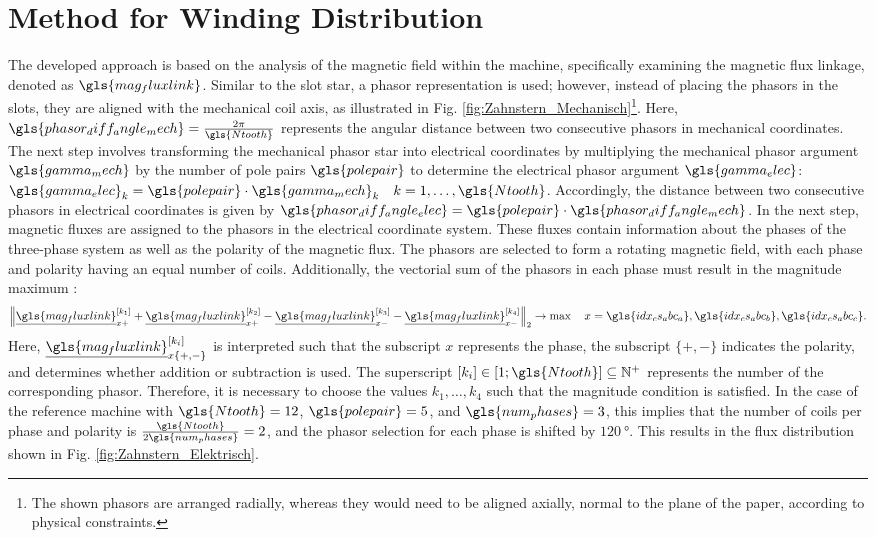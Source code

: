 \section{Method for Winding Distribution} \label{sec:WindingDist}
The developed approach is based on the analysis of the magnetic field within the machine, specifically examining the magnetic flux linkage, denoted as \(\gls{mag_fluxlink}\). Similar to the slot star, a phasor representation is used; however, instead of placing the phasors in the slots, they are aligned with the mechanical coil axis, as illustrated in Fig. \ref{fig:Zahnstern_Mechanisch}\footnote{The shown phasors are arranged radially, whereas they would need to be aligned axially, normal to the plane of the paper, according to physical constraints.}. Here, \(\gls{phasor_diff_angle_mech} = \frac{2\pi}{\gls{Ntooth}}\) represents the angular distance between two consecutive phasors in mechanical coordinates. The next step involves transforming the mechanical phasor star into electrical coordinates by multiplying the mechanical phasor argument \(\gls{gamma_mech}\) by the number of pole pairs \(\gls{polepair}\) to determine the electrical phasor argument \(\gls{gamma_elec}\): \(\gls{gamma_elec}_{k} = \gls{polepair} \cdot \gls{gamma_mech}_{k} \quad k = 1, \dots, \gls{Ntooth}\). Accordingly, the distance between two consecutive phasors in electrical coordinates is given by \(\gls{phasor_diff_angle_elec} = \gls{polepair} \cdot \gls{phasor_diff_angle_mech}\). In the next step, magnetic fluxes are assigned to the phasors in the electrical coordinate system. These fluxes contain information about the phases of the three-phase system as well as the polarity of the magnetic flux. The phasors are selected to form a rotating magnetic field, with each phase and polarity having an equal number of coils. Additionally, the vectorial sum of the phasors in each phase must result in the magnitude maximum :
%
\begin{equation}
    \pNorm
    {
        \phasor{\gls{mag_fluxlink}}[_{x+}^{\discretestep{k_1}}] +
        \phasor{\gls{mag_fluxlink}}[_{x+}^{\discretestep{k_2}}] -
        \phasor{\gls{mag_fluxlink}}[_{x-}^{\discretestep{k_3}}] -
        \phasor{\gls{mag_fluxlink}}[_{x-}^{\discretestep{k_4}}]
    }[2] \to \max \quad x = \gls{idx_cs_abc_a}, \gls{idx_cs_abc_b}, \gls{idx_cs_abc_c}.
    \label{equ:Bopt}
\end{equation}
%
Here, \(\phasor{\gls{mag_fluxlink}}[_{x\{+,-\}}^{\discretestep{k_i}}]\) is interpreted such that the subscript \(x\) represents the phase, the subscript \(\{+,-\}\) indicates the polarity, and determines whether addition or subtraction is used. The superscript \(\discretestep{k_i} \in [1;\gls{Ntooth}] \subseteq \mathbb{N}^{+}\) represents the number of the corresponding phasor. Therefore, it is necessary to choose the values \(k_1, \dots, k_4\) such that the magnitude condition is satisfied. In the case of the reference machine with \(\gls{Ntooth}=12\), \(\gls{polepair}=5\), and \(\gls{num_phases}=3\), this implies that the number of coils per phase and polarity is \(\frac{\gls{Ntooth}}{2\gls{num_phases}} = 2\), and the phasor selection for each phase is shifted by \(\SI{120}{\degree}\). This results in the flux distribution shown in Fig. \ref{fig:Zahnstern_Elektrisch}.
